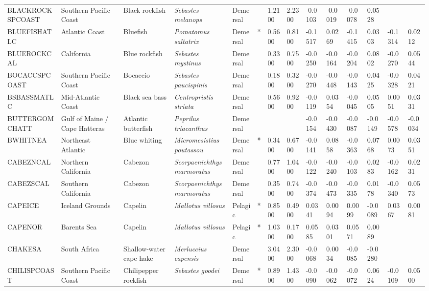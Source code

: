 \begin{longtable}{p{2.6cm}p{1.9cm}p{1.7cm}p{1.6cm}p{1cm}p{0.3cm}p{1cm}p{1cm}p{1cm}p{1.1cm}p{1cm}p{1.1cm}p{1cm}p{1.1cm}}
  BLACKROCKSPCOAST & Southern Pacific Coast & Black rockfish & \textit{Sebastes melanops} & Demersal &   & 1.2100 & 2.2300 & -0.0103 & -0.0019 & -0.0078 & 0.0528 &  &  \\ 
  BLUEFISHATLC & Atlantic Coast & Bluefish & \textit{Pomatomus saltatrix} & Demersal & * & 0.5600 & 0.8100 & -0.1517 & 0.0269 & -0.1415 & 0.0303 & -0.1314 & 0.0212 \\ 
  BLUEROCKCAL & California & Blue rockfish & \textit{Sebastes mystinus} & Demersal &   & 0.3300 & 0.7500 & -0.0250 & -0.0164 & -0.0204 & 0.0802 & -0.0270 & 0.0544 \\ 
  BOCACCSPCOAST & Southern Pacific Coast & Bocaccio & \textit{Sebastes paucispinis} & Demersal &   & 0.1800 & 0.3200 & -0.0270 & -0.0448 & -0.0143 & 0.0425 & -0.0328 & 0.0421 \\ 
  BSBASSMATLC & Mid-Atlantic Coast & Black sea bass & \textit{Centropristis striata} & Demersal &   & 0.5600 & 0.9200 & -0.0119 & 0.0354 & -0.0045 & 0.0505 & 0.0051 & 0.0331 \\ 
  BUTTERGOMCHATT & Gulf of Maine / Cape Hatteras & Atlantic butterfish & \textit{Peprilus triacanthus} & Demersal &  &  &  & -0.0154 & -0.0430 & -0.0087 & -0.0149 & -0.0578 & -0.0034 \\ 
  BWHITNEA & Northeast Atlantic & Blue whiting & \textit{Micromesistius poutassou} & Demersal & * & 0.3400 & 0.6700 & -0.0141 & 0.0858 & -0.0363 & 0.0768 & 0.0073 & 0.0351 \\ 
  CABEZNCAL & Northern California & Cabezon & \textit{Scorpaenichthys marmoratus} & Demersal &   & 0.7700 & 1.0400 & -0.0122 & -0.0240 & -0.0103 & 0.0283 & -0.0162 & 0.0231 \\ 
  CABEZSCAL & Southern California & Cabezon & \textit{Scorpaenichthys marmoratus} & Demersal &   & 0.3500 & 0.7400 & -0.0374 & -0.0473 & -0.0335 & 0.0178 & -0.0340 & 0.0573 \\ 
  CAPEICE & Iceland Grounds & Capelin & \textit{Mallotus villosus} & Pelagic & * & 0.8500 & 0.4900 & 0.0341 & 0.0094 & 0.0099 & -0.0089 & 0.0367 & 0.0081 \\ 
  CAPENOR & Barents Sea & Capelin & \textit{Mallotus villosus} & Pelagic & * & 1.0300 & 0.1700 & 0.0585 & 0.0301 & 0.0571 & 0.0089 &  &  \\ 
  CHAKESA & South Africa & Shallow-water cape hake & \textit{Merluccius capensis} & Demersal &   & 3.0400 & 2.3000 & -0.0068 & 0.0034 & -0.0085 & -0.0280 &  &  \\ 
  CHILISPCOAST & Southern Pacific Coast & Chilipepper rockfish & \textit{Sebastes goodei} & Demersal & * & 0.8900 & 1.4300 & -0.0090 & -0.0062 & -0.0072 & 0.0624 & -0.0109 & 0.0500 \\ 

\end{longtable}
